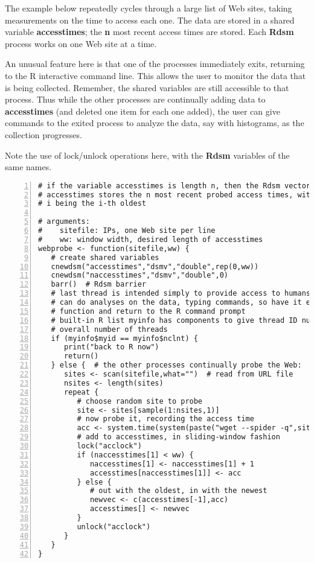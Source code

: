 The example below repeatedly cycles through a large list of Web sites,
taking measurements on the time to access each one.  The data are stored
in a shared variable {\bf accesstimes}; the {\bf n} most recent access
times are stored.  Each {\bf Rdsm} process works on one Web site at a
time.

An unusual feature here is that one of the processes immediately exits,
returning to the R interactive command line.  This allows the user to
monitor the data that is being collected.  Remember, the shared
variables are still accessible to that process.  Thus while the other
processes are continually adding data to {\bf accesstimes} (and deleted
one item for each one added), the user can give commands to the exited
process to analyze the data, say with histograms, as the collection
progresses.

Note the use of lock/unlock operations here, with the {\bf Rdsm}
variables of the same names.

\begin{lstlisting}[numbers=left]
# if the variable accesstimes is length n, then the Rdsm vector
# accesstimes stores the n most recent probed access times, with element
# i being the i-th oldest

# arguments:
#    sitefile: IPs, one Web site per line
#    ww: window width, desired length of accesstimes
webprobe <- function(sitefile,ww) {
   # create shared variables
   cnewdsm("accesstimes","dsmv","double",rep(0,ww))
   cnewdsm("naccesstimes","dsmv","double",0)
   barr()  # Rdsm barrier
   # last thread is intended simply to provide access to humans, who
   # can do analyses on the data, typing commands, so have it exit this
   # function and return to the R command prompt
   # built-in R list myinfo has components to give thread ID number and
   # overall number of threads
   if (myinfo$myid == myinfo$nclnt) {
      print("back to R now")
      return()
   } else {  # the other processes continually probe the Web:
      sites <- scan(sitefile,what="")  # read from URL file
      nsites <- length(sites)
      repeat {
         # choose random site to probe
         site <- sites[sample(1:nsites,1)]
         # now probe it, recording the access time
         acc <- system.time(system(paste("wget --spider -q",site)))[3]
         # add to accesstimes, in sliding-window fashion
         lock("acclock")
         if (naccesstimes[1] < ww) {
            naccesstimes[1] <- naccesstimes[1] + 1
            accesstimes[naccesstimes[1]] <- acc
         } else {
            # out with the oldest, in with the newest
            newvec <- c(accesstimes[-1],acc)
            accesstimes[] <- newvec
         }
         unlock("acclock")
      }
   }
}
\end{lstlisting}

